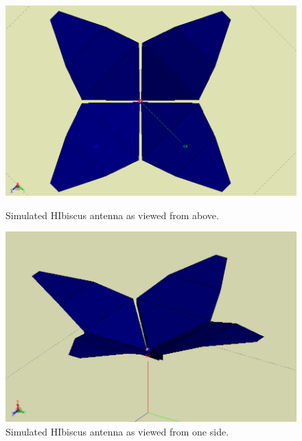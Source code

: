 \begin{figure}[htb]
\centering
\begin{minipage}[b]{0.49\textwidth}
\centering
\includegraphics[width=0.95\linewidth]{SCIHI_system/figures/HIbiscus_top.png}
\caption{Simulated HIbiscus antenna as viewed from above.}
\label{Fig:HI_sim_top}
\end{minipage}%
\begin{minipage}[b]{0.02\textwidth}
\hspace{1cm}
\end{minipage}%
\begin{minipage}[b]{0.49\textwidth}
\centering
\includegraphics[width=0.95\linewidth]{SCIHI_system/figures/HIbiscus_ISO.png}
\caption{Simulated HIbiscus antenna as viewed from one side.}
\label{Fig:HI_sim_side}
\end{minipage}
\end{figure}


